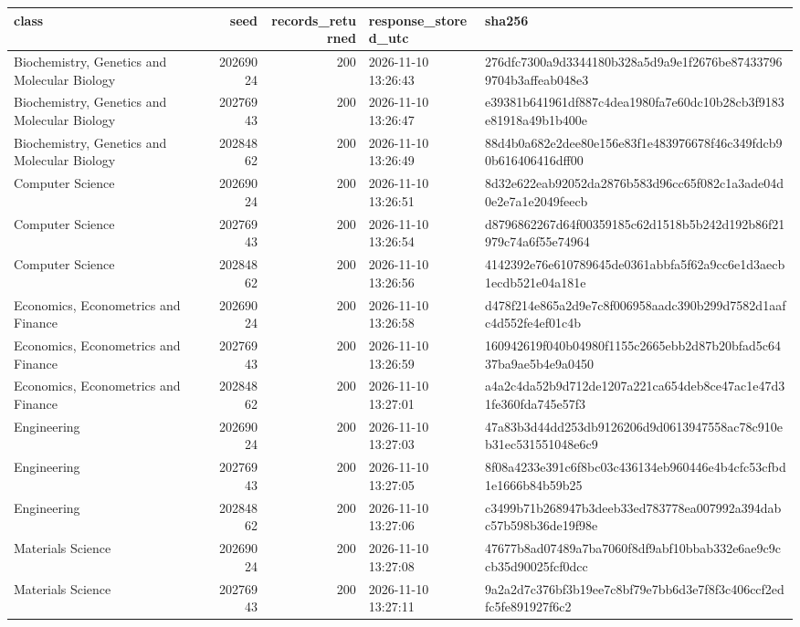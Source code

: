 \begin{tabular}{lrrll}
\toprule
class & seed & records\_returned & response\_stored\_utc & sha256 \\
\midrule
Biochemistry, Genetics and Molecular Biology & 20269024 & 200 & 2026-11-10 13:26:43 & 276dfc7300a9d3344180b328a5d9a9e1f2676be874337969704b3affeab048e3 \\
Biochemistry, Genetics and Molecular Biology & 20276943 & 200 & 2026-11-10 13:26:47 & e39381b641961df887c4dea1980fa7e60dc10b28cb3f9183e81918a49b1b400e \\
Biochemistry, Genetics and Molecular Biology & 20284862 & 200 & 2026-11-10 13:26:49 & 88d4b0a682e2dee80e156e83f1e483976678f46c349fdcb90b616406416dff00 \\
Computer Science & 20269024 & 200 & 2026-11-10 13:26:51 & 8d32e622eab92052da2876b583d96cc65f082c1a3ade04d0e2e7a1e2049feecb \\
Computer Science & 20276943 & 200 & 2026-11-10 13:26:54 & d8796862267d64f00359185c62d1518b5b242d192b86f21979c74a6f55e74964 \\
Computer Science & 20284862 & 200 & 2026-11-10 13:26:56 & 4142392e76e610789645de0361abbfa5f62a9cc6e1d3aecb1ecdb521e04a181e \\
Economics, Econometrics and Finance & 20269024 & 200 & 2026-11-10 13:26:58 & d478f214e865a2d9e7c8f006958aadc390b299d7582d1aafc4d552fe4ef01c4b \\
Economics, Econometrics and Finance & 20276943 & 200 & 2026-11-10 13:26:59 & 160942619f040b04980f1155c2665ebb2d87b20bfad5c6437ba9ae5b4e9a0450 \\
Economics, Econometrics and Finance & 20284862 & 200 & 2026-11-10 13:27:01 & a4a2c4da52b9d712de1207a221ca654deb8ce47ac1e47d31fe360fda745e57f3 \\
Engineering & 20269024 & 200 & 2026-11-10 13:27:03 & 47a83b3d44dd253db9126206d9d0613947558ac78c910eb31ec531551048e6c9 \\
Engineering & 20276943 & 200 & 2026-11-10 13:27:05 & 8f08a4233e391c6f8bc03c436134eb960446e4b4cfc53cfbd1e1666b84b59b25 \\
Engineering & 20284862 & 200 & 2026-11-10 13:27:06 & c3499b71b268947b3deeb33ed783778ea007992a394dabc57b598b36de19f98e \\
Materials Science & 20269024 & 200 & 2026-11-10 13:27:08 & 47677b8ad07489a7ba7060f8df9abf10bbab332e6ae9c9ccb35d90025fcf0dcc \\
Materials Science & 20276943 & 200 & 2026-11-10 13:27:11 & 9a2a2d7c376bf3b19ee7c8bf79e7bb6d3e7f8f3c406ccf2edfc5fe891927f6c2 \\

\end{tabular}
